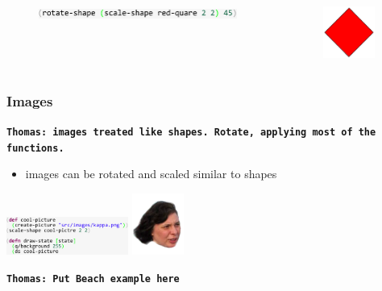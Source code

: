 \documentclass{beamer}
\newcommand{\comment}[1]{{\bf \tt  {#1}}}
\newcommand{\thcomment}[1]{\textcolor{BestBlue}{\comment{Thomas: {#1}}}}
\begin{document}
\begin{frame}[fragile]
\begin{itemize}
		\begin{columns}[t]
		\begin{column}{.45\textwidth}
			\begin{figure}[h]
			\includegraphics[width=6.5cm]{PresentationImages/rotateAndScaleRedCode.png}
			\end{figure}
		\end{column}
		\begin{column}{.3\textwidth}
			\begin{figure}[h]
			\includegraphics[width=1.7cm]{PresentationImages/red-rectangle-scale-rotate.png}
			\end{figure}		
		\end{column}
		\end{columns}
	\end{itemize}
\end{frame}


\begin{frame}
\frametitle{Images}
\thcomment{images treated like shapes. Rotate, applying most of the functions.}
	\begin{itemize}
		\item images can be rotated and scaled similar to shapes
	\end{itemize}
	\includegraphics[width=4cm]{PresentationImages/pictureCode.png}
	\includegraphics[width=1.7cm]{PresentationImages/elena.png}
\end{frame}

\thcomment{Put Beach example here}
\end{document}

